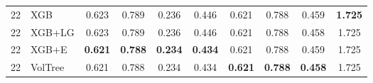\documentclass[runningheads]{llncs}
\begin{document}
\begin{table}[t]
\begin{tabular}{ll cccc cccc}
\midrule
22 & XGB      & 0.623 & 0.789 & 0.236 & 0.446 & 0.621 & 0.788 & 0.459 & \textbf{1.725} \\ %
22 & XGB+LG   & 0.623 & 0.789 & 0.236 & 0.446 & 0.621 & 0.788 & 0.458 & 1.725 \\ %
22 & XGB+E    & \textbf{0.621} & \textbf{0.788} & \textbf{0.234} & \textbf{0.434} & 0.621 & 0.788 & 0.459 & 1.725 \\ %
22 & VolTree & 0.621 & 0.788 & 0.234 & 0.434 & \textbf{0.621} & \textbf{0.788} & \textbf{0.458} & 1.725 \\ %
\bottomrule
\end{tabular}
\end{table}
\end{document}
